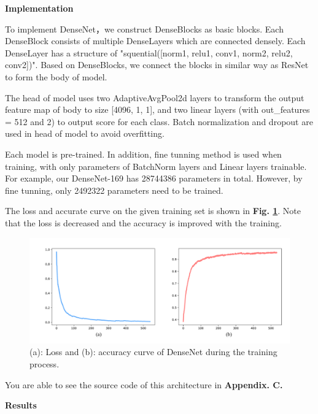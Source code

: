 \documentclass[a4paper]{article}
\begin{document}
\vspace{2mm}
\begin{center}
\large\textbf{Implementation} \\
\end{center}

\large{

To implement \textsf{DenseNet}，we construct DenseBlocks as basic blocks. Each DenseBlock consists of multiple DenseLayers which are connected densely. Each DenseLayer has a structure of "squential([norm1, relu1, conv1, norm2, relu2, conv2])". Based on DenseBlocks, we connect the blocks in similar way as \textsf{ResNet} to form the body of model.

The head of model uses two AdaptiveAvgPool2d layers to transform the output feature map of body to size [4096, 1, 1], and two linear layers (with out\_features = 512 and 2) to output score for each class. Batch normalization and dropout are used in head of model to avoid overfitting.

Each model is pre-trained. In addition, fine tunning method is used when training, with only parameters of BatchNorm layers and Linear layers trainable. For example, our \textsf{DenseNet-169} has 28744386 parameters in total. However, by fine tunning, only 2492322 parameters need to be trained.

The loss and accurate curve on the given training set is shown in \textbf{Fig. \ref{denseacc}}. Note that the loss is decreased and the accuracy is improved with the training.

\begin{figure}[h]
\centering
\includegraphics[width=15cm]{dense_acc.pdf}
\caption{(a): Loss and (b): accuracy curve of \textsf{DenseNet} during the training process.}
\label{denseacc}
\end{figure}

}

\large{You are able to see the source code of this architecture in \textbf{Appendix. C.}}
\vspace{2mm}
\begin{center}
\large\textbf{Results} \\
\end{center}
\end{document}
